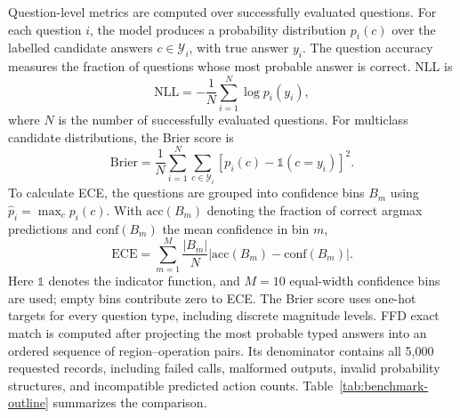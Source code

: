 \documentclass[a4paper,fleqn]{cas-dc}
\begin{document}
Question-level metrics are computed over successfully evaluated questions. For
each question $i$, the model produces a probability distribution $p_i(c)$ over
the labelled candidate answers $c\in\mathcal{Y}_i$, with true answer $y_i$.
The question accuracy measures the fraction of questions whose most probable
answer is correct. NLL is
\begin{equation}
\mathrm{NLL}=-\frac{1}{N}\sum_{i=1}^{N}\log p_i(y_i),
\label{eq:nll}
\end{equation}
where $N$ is the number of successfully evaluated questions. For multiclass
candidate distributions, the Brier score is
\begin{equation}
\mathrm{Brier}=\frac{1}{N}\sum_{i=1}^{N}\sum_{c\in\mathcal{Y}_i}
\left[p_i(c)-\mathbb{1}(c=y_i)\right]^2.
\label{eq:brier}
\end{equation}
To calculate ECE, the questions are grouped into
confidence bins $B_m$ using $\hat{p}_i=\max_c p_i(c)$. With
$\mathrm{acc}(B_m)$ denoting the fraction of correct argmax predictions and
$\mathrm{conf}(B_m)$ the mean confidence in bin $m$,
\begin{equation}
\mathrm{ECE}=\sum_{m=1}^{M}\frac{|B_m|}{N}
\left|\mathrm{acc}(B_m)-\mathrm{conf}(B_m)\right|.
\label{eq:ece}
\end{equation}
Here $\mathbb{1}$ denotes the indicator function, and $M=10$ equal-width
confidence bins are used; empty bins contribute zero to ECE. The Brier score
uses one-hot targets for every question type, including discrete magnitude
levels. FFD exact match is computed after projecting the most probable typed
answers into an
ordered sequence of region--operation pairs. Its denominator contains all 5,000
requested records, including failed calls, malformed outputs, invalid probability
structures, and incompatible predicted action counts. Table~\ref{tab:benchmark-outline}
summarizes the comparison.
\end{document}
